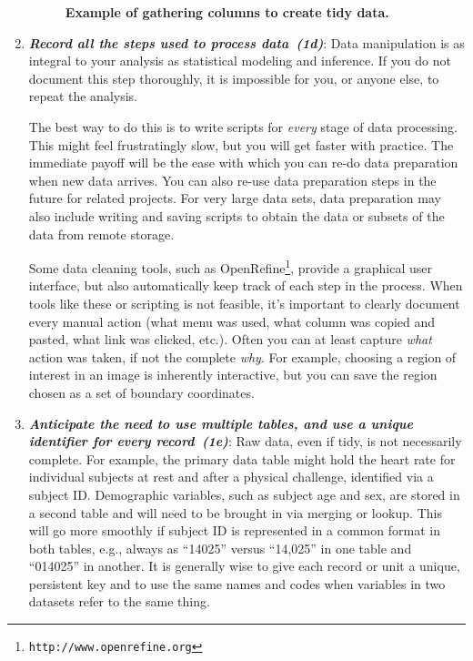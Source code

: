 \documentclass[10pt,letterpaper]{article}
\newcommand{\withurl}[2]{{#1}\footnote{{\texttt{#2}}}}
\newcommand{\practice}[2]{\textbf{\emph{{#2}~({#1})}}}
\begin{document}
\begin{enumerate}
  \begin{figure} %
    \caption{\textbf{Example of gathering columns to create tidy data.}}
    \label{fig:tidy}
  \end{figure}

\item

  \practice{1d}{Record all the steps used to process data}: Data
  manipulation is as integral to your analysis as statistical modeling
  and inference. If you do not document this step thoroughly, it is
  impossible for you, or anyone else, to repeat the analysis.

  The best way to do this is to write scripts for \emph{every} stage
  of data processing.  This might feel frustratingly slow, but you
  will get faster with practice. The immediate payoff will be the ease
  with which you can re-do data preparation when new data arrives. You
  can also re-use data preparation steps in the future for related
  projects. For very large data sets, data preparation may also
  include writing and saving scripts to obtain the data or subsets of
  the data from remote storage.

  Some data cleaning tools, such as
  \withurl{OpenRefine}{http://www.openrefine.org}, provide a graphical
  user interface, but also automatically keep track of each step in
  the process. When tools like these or scripting is not feasible,
  it's important to clearly document every manual action (what menu
  was used, what column was copied and pasted, what link was clicked,
  etc.).  Often you can at least capture \emph{what} action was taken,
  if not the complete \emph{why}. For example, choosing a region of
  interest in an image is inherently interactive, but you can save the
  region chosen as a set of boundary coordinates.

\item

  \practice{1e}{Anticipate the need to use multiple tables, and use a
  unique identifier for every record}: Raw data, even if tidy, is
  not necessarily complete. For example, the primary data table might
  hold the heart rate for individual subjects at rest and after a
  physical challenge, identified via a subject ID.  Demographic
  variables, such as subject age and sex, are stored in a second table
  and will need to be brought in via merging or lookup. This will go
  more smoothly if subject ID is represented in a common format in
  both tables, e.g., always as ``14025'' versus ``14,025'' in one
  table and ``014025'' in another. It is generally wise to give each
  record or unit a unique, persistent key and to use the same names
  and codes when variables in two datasets refer to the same thing.


\end{enumerate}
\end{document}
